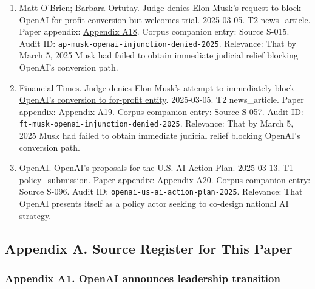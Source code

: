 \documentclass[
  american,
  11pt,
  letterpaper,
]{article}
\begin{document}
\begin{enumerate}
  defendants and an active procedural history.
\item
  Matt O'Brien; Barbara Ortutay.
  \href{https://apnews.com/article/elon-musk-openai-lawsuit-f5724e7ab07b5bed8292a1e8aa2ef695}{Judge
  denies Elon Musk's request to block OpenAI for-profit conversion but
  welcomes trial}. 2025-03-05. T2 news\_article. Paper appendix:
  \hyperref[ch-08-appendix-a18-judge-denies-elon-musk-s-request-to-block-openai-for-profit-conversion-but-welcomes-trial]{Appendix
  A18}. Corpus companion entry: Source S-015. Audit ID:
  \texttt{ap-musk-openai-injunction-denied-2025}. Relevance: That by
  March 5, 2025 Musk had failed to obtain immediate judicial relief
  blocking OpenAI's conversion path.
\item
  Financial Times.
  \href{https://www.ft.com/content/532931dd-e1c0-4f18-a8af-5777dd70a52d}{Judge
  denies Elon Musk's attempt to immediately block OpenAI's conversion to
  for-profit entity}. 2025-03-05. T2 news\_article. Paper appendix:
  \hyperref[ch-08-appendix-a19-judge-denies-elon-musks-attempt-to-immediately-block-openais-conversion-to-for-profit-entity]{Appendix
  A19}. Corpus companion entry: Source S-057. Audit ID:
  \texttt{ft-musk-openai-injunction-denied-2025}. Relevance: That by
  March 5, 2025 Musk had failed to obtain immediate judicial relief
  blocking OpenAI's conversion path.
\item
  OpenAI.
  \href{https://openai.com/global-affairs/openai-proposals-for-the-us-ai-action-plan/}{OpenAI's
  proposals for the U.S. AI Action Plan}. 2025-03-13. T1
  policy\_submission. Paper appendix:
  \hyperref[ch-08-appendix-a20-openais-proposals-for-the-us-ai-action-plan]{Appendix
  A20}. Corpus companion entry: Source S-096. Audit ID:
  \texttt{openai-us-ai-action-plan-2025}. Relevance: That OpenAI
  presents itself as a policy actor seeking to co-design national AI
  strategy.
\end{enumerate}

\subsection{Appendix A. Source Register for This
Paper}\label{appendix-a.-source-register-for-this-paper-8}

\subsubsection{Appendix A1. OpenAI announces leadership
transition}\label{ch-08-appendix-a1-openai-announces-leadership-transition}
\end{document}

